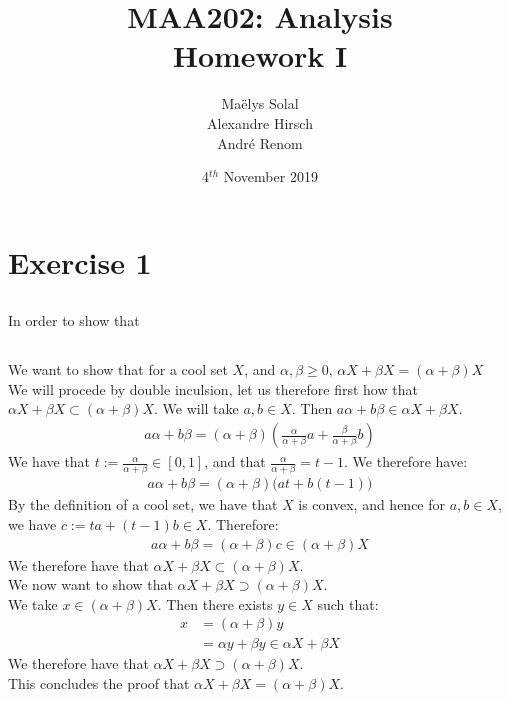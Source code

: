 \documentclass{article}
\title{MAA202: Analysis\\Homework I}
\date{4$^{th}$ November 2019}
\author{Ma\"elys Solal\\Alexandre Hirsch\\Andr\'e Renom}
\begin{document}
	\maketitle

	\newpage

\section{Exercise 1}
\subsection{}
In order to show that

\subsection{}
We want to show that for a cool set $X$, and $\alpha,\beta \geq 0, \, \alpha X + \beta X = (\alpha + \beta )X$\\
We will procede by double inculsion, let us therefore first how that $\alpha X + \beta X \subset (\alpha + \beta )X$. We will take $a,b \in X$. Then $a\alpha + b\beta \in  \alpha X + \beta X$.
\begin{align*}
	a\alpha + b\beta = (\alpha + \beta )\left( \frac{\alpha}{\alpha + \beta}a +  \frac{\beta}{\alpha + \beta}b \right)
\end{align*}
We have that $t := \frac{\alpha}{\alpha + \beta} \in [0,1]$, and that $\frac{\alpha}{\alpha + \beta} = t-1$. We therefore have:
\begin{align*}
	a\alpha + b\beta = (\alpha + \beta )\big(at + b(t-1)\big)
\end{align*}
By the definition of a cool set, we have that $X$ is convex, and hence for $a,b \in X$, we have $c:=ta + (t-1)b \in X$. Therefore:
\begin{align*}
	a\alpha + b\beta = (\alpha + \beta )c \in (\alpha + \beta )X
\end{align*}
We therefore have that $\alpha X + \beta X \subset (\alpha + \beta )X$.\\We now want to show that $\alpha X + \beta X \supset (\alpha + \beta )X$.\\ We take $x \in (\alpha + \beta )X$. Then there exists $y \in X$ such that:
\begin{align*}
	x &= (\alpha + \beta )y\\
	&= \alpha y + \beta y \in \alpha X + \beta X
\end{align*}
We therefore have that $\alpha X + \beta X \supset (\alpha + \beta )X$.\\ This concludes the proof that $\alpha X + \beta X = (\alpha + \beta )X$.
\end{document}
